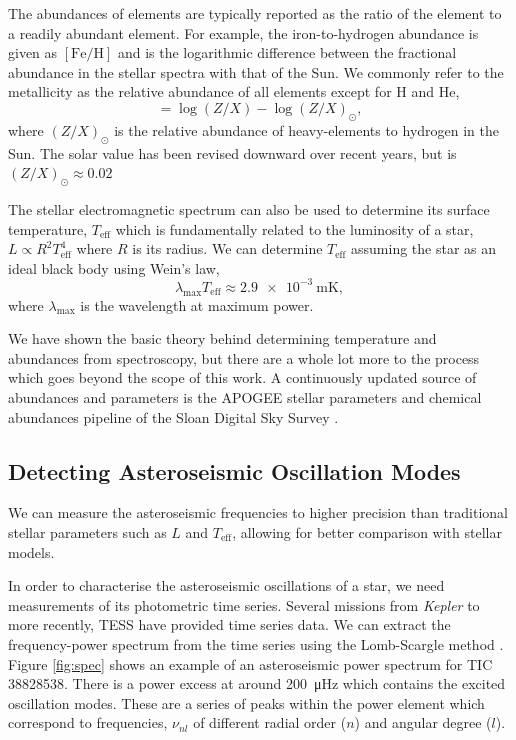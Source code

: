 The abundances of elements are typically reported as the ratio of the element to a readily abundant element. For example, the iron-to-hydrogen abundance is given as $[\mathrm{Fe/H}]$ and is the logarithmic difference between the fractional abundance in the stellar spectra with that of the Sun. We commonly refer to the metallicity as the relative abundance of all elements except for H and He,
\begin{equation}
    [\mathrm{M/H}] = \log(Z/X) - \log(Z/X)_\odot,
\end{equation}
where $(Z/X)_\odot$ is the relative abundance of heavy-elements to hydrogen in the Sun. The solar value has been revised downward over recent years, but is $(Z/X)_\odot \approx 0.02$ \citep{Grevesse.Sauval1998, Asplund.Grevesse.ea2005, Asplund.Grevesse.ea2009}

The stellar electromagnetic spectrum can also be used to determine its surface temperature, $T_\mathrm{eff}$ which is fundamentally related to the luminosity of a star, $L \propto R^2T_\mathrm{eff}^4$ where $R$ is its radius. We can determine $T_\mathrm{eff}$ assuming the star as an ideal black body using Wein's law,
\begin{equation}
    \lambda_\mathrm{max} T_\mathrm{eff} \approx \SI{2.9e-3}{\meter\kelvin},
\end{equation}
where $\lambda_\mathrm{max}$ is the wavelength at maximum power.

We have shown the basic theory behind determining temperature and abundances from spectroscopy, but there are a whole lot more to the process which goes beyond the scope of this work. A continuously updated source of abundances and parameters is the APOGEE stellar parameters and chemical abundances pipeline \citep[ASPCAP;][]{GarciaPerez.AllendePrieto.ea2016} of the Sloan Digital Sky Survey \citep[SDSS;][]{Blanton.Bershady.ea2017}.

\subsection{Detecting Asteroseismic Oscillation Modes}\label{sec:astero-obs}

We can measure the asteroseismic frequencies to higher precision than traditional stellar parameters such as $L$ and $T_\mathrm{eff}$, allowing for better comparison with stellar models.

In order to characterise the asteroseismic oscillations of a star, we need measurements of its photometric time series. Several missions from \emph{Kepler} \citep{Borucki.Koch.ea2010} to more recently, TESS \citep{Ricker.Winn.ea2015} have provided time series data. We can extract the frequency-power spectrum from the time series using the Lomb-Scargle method \citep{Lomb1976, Scargle1982}. Figure \ref{fig:spec} shows an example of an asteroseismic power spectrum for TIC 38828538. There is a power excess at around \SI{200}{\micro\hertz} which contains the excited oscillation modes. These are a series of peaks within the power element which correspond to frequencies, $\nu_{nl}$ of different radial order ($n$) and angular degree ($l$).

